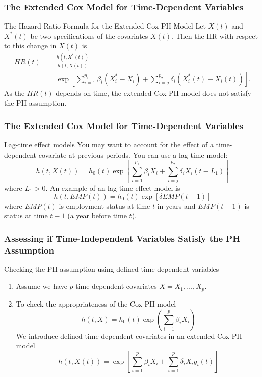 \documentclass{beamer}
\theoremstyle{definition}
\begin{document}
\begin{frame}
\frametitle{The Extended Cox Model for Time-Dependent Variables}
\begin{block}{The Hazard Ratio Formula for the Extended Cox PH Model}
Let $X(t)$ and $X^*(t)$ be two specifications of the covariates $X(t)$. Then the HR with respect to this change in $X(t)$ is
\begin{align*}
HR(t) &= \frac{h(t,X^*(t))}{h(t,X(t))} \\
& = \exp\left[\sum_{i=1}^{p_1} \beta_i(X^*_i - X_i) + \sum_{i=j}^{p_2} \delta_i(X^*_i(t) - X_i(t))\right].
\end{align*}
As the $HR(t)$ depends on time, the extended Cox PH model does not satisfy the PH assumption.
\end{block}
\end{frame}


\begin{frame}
\frametitle{The Extended Cox Model for Time-Dependent Variables}
\begin{block}{Lag-time effect models}
You may want to account for the effect of a time-dependent covariate at previous periods. You can use a lag-time model:
\[
h(t,X(t)) = h_0(t) \exp\left[\sum_{i=1}^{p_1} \beta_i X_i + \sum_{i=j}^{p_2} \delta_i X_i(t-L_1)\right]
\]
where $L_1>0$.
An example of an lag-time effect model is
\[
h(t,EMP(t)) = h_0(t)\exp[\delta EMP(t-1)]
\]
where $EMP(t)$ is employment status at time $t$ in years and $EMP(t-1)$ is status at time $t-1$ (a year before time $t$).
\end{block}
\end{frame}

\begin{frame}
\frametitle{Assessing if Time-Independent Variables Satisfy the PH Assumption}
\begin{block}{Checking the PH assumption using defined time-dependent variables}
\begin{enumerate}
\item Assume we have $p$ time-dependent covariates $X=X_1,\ldots,X_p$.
\item To check the appropriateness of the Cox PH model
\begin{equation} \label{reducedCPH}
h(t,X) = h_0(t)\exp\left(\sum_{i=1}^p \beta_i X_i \right)
\end{equation}
We introduce defined time-dependent covariates in an extended Cox PH model
\begin{equation} \label{fullintCPH}
h(t,X(t)) = \exp\left[\sum_{i=1}^p \beta_i X_i + \sum_{i=1}^p \delta_i X_i g_i(t)\right]
\end{equation}
\end{enumerate}
\end{block}
\end{frame}
\end{document}
